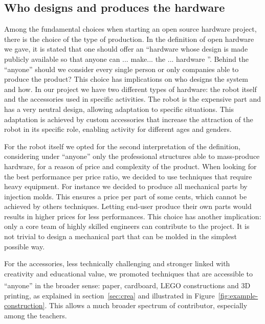 \documentclass[letterpaper, 10 pt, conference]{ieeeconf}  %
\begin{document}
\subsection{Who designs and produces the hardware}

Among the fundamental choices when starting an open source hardware project, there is the choice of the type of production. 
In the definition of open hardware we gave, it is stated that one should offer an ``hardware whose design is made publicly available so that anyone can ... make... the ... hardware ''.
Behind the ``anyone'' should we consider every single person or only companies able to produce the product?
This choice has implications on who designs the system and how.
In our project we have two different types of hardware: the robot itself and the accessories used in specific activities.
The robot is the expensive part and has a very neutral design, allowing adaptation to specific situations.
This adaptation is achieved by custom accessories that increase the attraction of the robot in its specific role, enabling activity for different ages and genders.

For the robot itself we opted for the second interpretation of the definition, considering under ``anyone'' only the professional structures able to mass-produce hardware, for a reason of price and complexity of the product. 
When looking for the best performance per price ratio, we decided to use techniques that require heavy equipment.
For instance we decided to produce all mechanical parts by injection molds. 
This ensures a price per part of some cents, which cannot be achieved by others techniques.
Letting end-user produce their own parts would results in higher prices for less performances. 
This choice has another implication: only a core team of highly skilled engineers can contribute to the project. 
It is not trivial to design a mechanical part that can be molded in the simplest possible way.

For the accessories, less technically challenging and stronger linked with creativity and educational value, we promoted techniques that are accessible to ``anyone'' in the broader sense: paper, cardboard, LEGO\textsuperscript{\textregistered} constructions and 3D printing, as explained in section~\ref{sec:crea} and illustrated in Figure~\ref{fig:example-construction}.
This allows a much broader spectrum of contributor, especially among the teachers.
\end{document}
